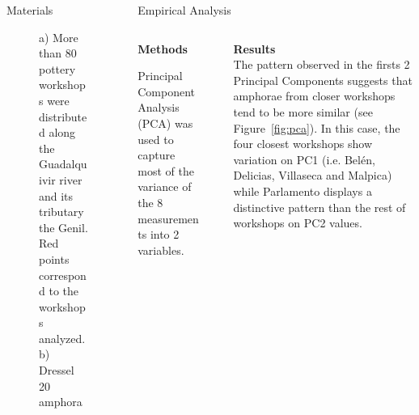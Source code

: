 \documentclass[final]{beamer}
\newlength{\sepwid}
\newlength{\onecolwid}
\newlength{\twocolwid}
\begin{document}
\begin{frame}[t]
\begin{columns}[t]
\begin{column}{\onecolwid}
\begin{block}{Materials}
\begin{figure}
\singlespace
\caption{a) More than 80 pottery workshops were distributed along the Guadalquivir river and its tributary the Genil. Red points correspond to the workshops analyzed. b) Dressel 20 amphora}
\label{fig:betica}
\end{figure}


 \end{block}
\end{column} %

\begin{column}{\twocolwid}


\begin{block}{Empirical Analysis}

\begin{columns}[t,totalwidth=\twocolwid]
\begin{column}{\onecolwid} %


{\textbf{Methods}} 
\justify

Principal Component Analysis (PCA) was used to capture most of the variance of the 8 measurements into 2 variables. 


\end{column}

\begin{column}{\sepwid}\end{column} %

\begin{column}{\onecolwid} %

{\textbf{Results}}\\
\justify
The pattern observed in the firsts 2 Principal Components suggests that amphorae from closer workshops tend to be more similar (see Figure~\ref{fig:pca}). In this case, the four closest workshops show variation on PC1 (i.e. Bel\'en, Delicias, Villaseca and Malpica) while Parlamento displays a distinctive pattern than the rest of workshops on PC2 values.


\end{column}
\end{columns}

\begin{columns}[t,totalwidth=\twocolwid]



\end{columns}
\end{block}
\end{column}
\end{columns}
\end{frame}
\end{document}
